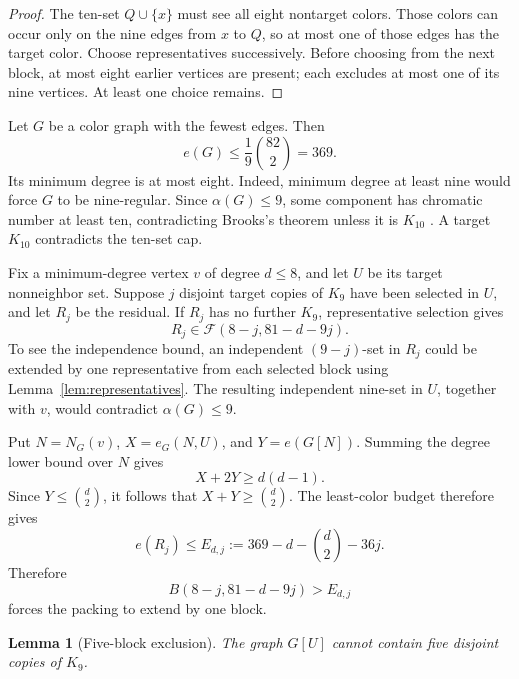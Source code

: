 \documentclass[11pt,reqno,a4paper]{amsart}
\newtheorem{lemma}[theorem]{Lemma}
\theoremstyle{definition}
\theoremstyle{remark}
\newcommand{\cF}{\mathcal F}
\begin{document}
\begin{proof}
The ten-set $Q\cup\{x\}$ must see all eight nontarget colors. Those
colors can occur only on the nine edges from $x$ to $Q$, so at most one
of those edges has the target color. Choose representatives successively.
Before choosing from the next block, at most eight earlier vertices are
present; each excludes at most one of its nine vertices. At least one
choice remains.
\end{proof}

Let $G$ be a color graph with the fewest edges. Then
\begin{equation}\label{eq:least}
 e(G)\le\frac{1}{9}\binom{82}{2}=369.
\end{equation}
Its minimum degree is at most eight. Indeed, minimum degree at least nine
would force $G$ to be nine-regular. Since $\alpha(G)\le9$, some component
has chromatic number at least ten, contradicting Brooks's theorem unless
it is $K_{10}$ \cite{Brooks1941}. A target $K_{10}$ contradicts the
ten-set cap.

Fix a minimum-degree vertex $v$ of degree $d\le8$, and let $U$ be its
target nonneighbor set. Suppose $j$ disjoint target copies of $K_9$ have
been selected in $U$, and let $R_j$ be the residual. If $R_j$ has no
further $K_9$, representative selection gives
\begin{equation}\label{eq:residual-family}
 R_j\in\cF(8-j,81-d-9j).
\end{equation}
To see the independence bound, an independent $(9-j)$-set in $R_j$
could be extended by one representative from each selected block using
Lemma~\ref{lem:representatives}. The resulting independent nine-set in
$U$, together with $v$, would contradict $\alpha(G)\le9$.

Put $N=N_G(v)$, $X=e_G(N,U)$, and $Y=e(G[N])$. Summing the degree
lower bound over $N$ gives
\[
 X+2Y\ge d(d-1).
\]
Since $Y\le\binom d2$, it follows that $X+Y\ge\binom d2$. The
least-color budget therefore gives
\begin{equation}\label{eq:outer-upper}
 e(R_j)\le
 E_{d,j}:=369-d-\binom d2-36j.
\end{equation}
Therefore
\begin{equation}\label{eq:packing-test}
 B(8-j,81-d-9j)>E_{d,j}
\end{equation}
forces the packing to extend by one block.

\begin{lemma}[Five-block exclusion]\label{lem:five-block}
The graph $G[U]$ cannot contain five disjoint copies of $K_9$.
\end{lemma}
\end{document}
